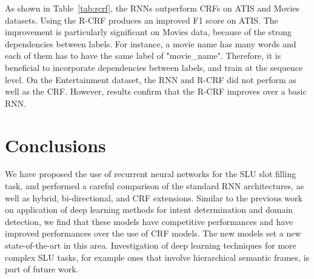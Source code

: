 As shown in Table~\ref{tab:rcrf}, the RNNs outperform CRFs on ATIS and Movies
datasets. Using the R-CRF produces an improved F1 score on ATIS. The
improvement is particularly significant on Movies data, because of the strong
dependencies between labels. For instance, a movie name has many words and each
of them has to have the same label of "movie\_name". Therefore, it is beneficial
to incorporate dependencies between labels, and train at the sequence level. On
the Entertainment dataset, the RNN and R-CRF did not perform as well as the
CRF. However, results confirm that the R-CRF improves over a basic RNN. 

\section{Conclusions}
\label{sec:conclu}

We have proposed the use of recurrent neural networks for the SLU slot filling
task, and performed a careful comparison of the standard RNN architectures, as
well as hybrid, bi-directional, and CRF extensions. Similar to the previous
work on application of deep learning methods for intent determination and
domain detection, we find that these models have competitive performances and
have improved performances over the use of CRF models. The new models set a new
state-of-the-art in this area. Investigation of deep learning techniques for
more complex SLU tasks, for example ones that involve hierarchical semantic
frames, is part of future work.
